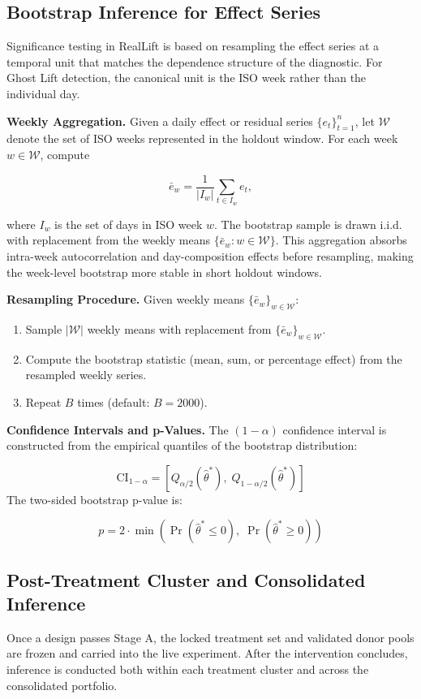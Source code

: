 \documentclass[11pt]{article}
\begin{document}
\subsection{Bootstrap Inference for Effect Series}
Significance testing in RealLift is based on resampling the effect series at a temporal unit that matches the dependence structure of the diagnostic. For Ghost Lift detection, the canonical unit is the ISO week rather than the individual day.

\textbf{Weekly Aggregation.} Given a daily effect or residual series $\{ e_t \}_{t=1}^{n}$, let $\mathcal{W}$ denote the set of ISO weeks represented in the holdout window. For each week $w \in \mathcal{W}$, compute

\[
\bar{e}_w = \frac{1}{|I_w|} \sum_{t \in I_w} e_t,
\]

where $I_w$ is the set of days in ISO week $w$. The bootstrap sample is drawn i.i.d. with replacement from the weekly means $\{\bar{e}_w : w \in \mathcal{W}\}$. This aggregation absorbs intra-week autocorrelation and day-composition effects before resampling, making the week-level bootstrap more stable in short holdout windows.

\textbf{Resampling Procedure.} Given weekly means $\{\bar{e}_w\}_{w \in \mathcal{W}}$:

\begin{enumerate}
\item Sample $|\mathcal{W}|$ weekly means with replacement from $\{\bar{e}_w\}_{w \in \mathcal{W}}$.
\item Compute the bootstrap statistic (mean, sum, or percentage effect) from the resampled weekly series.
\item Repeat $B$ times (default: $B = 2000$).
\end{enumerate}

\textbf{Confidence Intervals and p-Values.} The $(1 - \alpha)$ confidence interval is constructed from the empirical quantiles of the bootstrap distribution:

\[
\mathrm{CI}_{1-\alpha} = \left[ Q_{\alpha/2}(\hat{\theta}^*), \; Q_{1-\alpha/2}(\hat{\theta}^*) \right]
\]
The two-sided bootstrap p-value is:

\[
p = 2 \cdot \min\left( \Pr(\hat{\theta}^* \leq 0), \; \Pr(\hat{\theta}^* \geq 0) \right)
\]

\subsection{Post-Treatment Cluster and Consolidated Inference}
Once a design passes Stage A, the locked treatment set and validated donor pools are frozen and carried into the live experiment. After the intervention concludes, inference is conducted both within each treatment cluster and across the consolidated portfolio.
\end{document}
